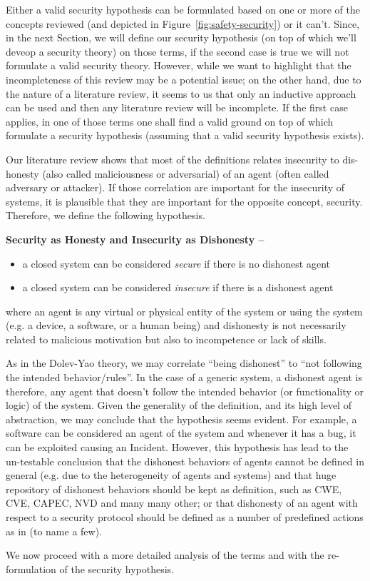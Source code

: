 Either a valid security hypothesis can be formulated based on one or more of
the concepts reviewed (and depicted in Figure~\ref{fig:safety-security}) or it
can't.  Since, in the next Section, we will define our security hypothesis (on
top of which we'll deveop a security theory) on those terms, if the second case
is true we will not formulate a valid security theory. However, while we want
to highlight that the incompleteness of this review may be a potential issue;
on the other hand, due to the nature of a literature review, it seems to us
that only an inductive approach can be used and then any literature review will
be incomplete.  If the first case applies, in one of those terms one shall find
a valid ground on top of which formulate a security hypothesis (assuming that a
valid security hypothesis exists). 

Our literature review shows that most of the definitions relates insecurity to
dis-honesty (also called maliciousness or adversarial) of an agent (often
called adversary or attacker).  If those correlation are important for the
insecurity of systems, it is plausible that they are important for the opposite
concept, security.  Therefore, we define the following hypothesis.
\begin{hypothesis}{\bf Security as Honesty and Insecurity as Dishonesty --}
	\begin{itemize}
		\item a closed system can be considered \emph{secure} if there
			is no dishonest agent
		\item a closed system can be considered \emph{insecure} if
			there is a dishonest agent 
	\end{itemize}
	where an agent is any virtual or physical entity of the system or using
	the system (e.g. a device, a software, or a human being) and dishonesty
	is not necessarily related to malicious motivation but also to
	incompetence or lack of skills.
\end{hypothesis}
As in the Dolev-Yao theory, we may correlate ``being dishonest'' to ``not
following the intended behavior/rules''.  In the case of a generic system, a
dishonest agent is therefore, any agent that doesn't follow the intended
behavior (or functionality or logic) of the system.  Given the generality of
the definition, and its high level of abstraction, we may
conclude that the hypothesis seems evident. For example, a software can be
considered an agent of the system and whenever it has a bug, it can be
exploited causing an Incident. However, this hypothesis has lead to the
un-testable conclusion that the dishonest behaviors of agents cannot be defined
in general (e.g. due to the heterogeneity of agents and systems) 
and that huge repository of dishonest behaviors should be kept as
definition, such as CWE\autocite{MITRE2020CWEresearch}, CVE\autocite{CVE},
CAPEC\autocite{MITRE2020CAPEC}, NVD\autocite{NIST2020NVD} and many many other;
or that dishonesty of an agent with respect to a security protocol should be
defined as a number of predefined actions as in
\autocite{Turuani2006clatse,Basin2005ofmc,Armando2016satmc,Rocchetto2017interpolation}
(to name a few). 

We now proceed with a more detailed analysis of the terms
and with the re-formulation of the security hypothesis.
